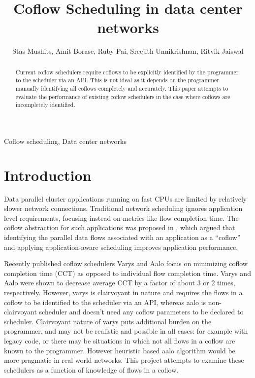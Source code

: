 \documentclass[conference]{IEEEtran}
\title{Coflow Scheduling in data center networks}
\begin{document}
\author{ Stas Mushits, Amit Borase, Ruby Pai, Sreejith Unnikrishnan, Ritvik Jaiswal }

\maketitle


\begin{abstract}
Current coflow schedulers require coflows to be explicitly identified by the programmer to the scheduler via an API. This is not ideal as it depends on the programmer manually identifying all coflows completely and accurately. This paper attempts to evaluate the performance of existing coflow schedulers in the case where coflows are incompletely identified.
\end{abstract}

\begin{IEEEkeywords}
Coflow scheduling, Data center networks
\end{IEEEkeywords}

\section{Introduction}

Data parallel cluster applications running on fast CPUs are limited by relatively slower network connections. Traditional network scheduling ignores application level requirements, focusing instead on metrics like flow completion time. The coflow abstraction for such applications was proposed in \cite{coflow}, which argued that identifying the parallel data flows associated with an application as a ``coflow'' and applying application-aware scheduling improves application performance.

Recently published coflow schedulers Varys \cite{varys} and Aalo \cite{aalo} focus on minimizing coflow completion time (CCT) as opposed to individual flow completion time. Varys and Aalo were shown to decrease average CCT by a factor of about 3 or 2 times, respectively. However, varys is clairvoyant in nature and requires the flows in a coflow to be identified to the scheduler via an API, whereas aalo is non-clairvoyant scheduler and doesn't need any coflow parameters to be declared to scheduler. Clairvoyant nature of varys puts additional burden on the programmer, and may not be realistic and possible in all cases: for example with legacy code, or there may be situations in which not all flows in a coflow are known to the programmer. However heuristic based aalo algorithm would be more pragmatic in real world networks. This project attempts to examine these schedulers as a function of knowledge of flows in a coflow.
\end{document}
